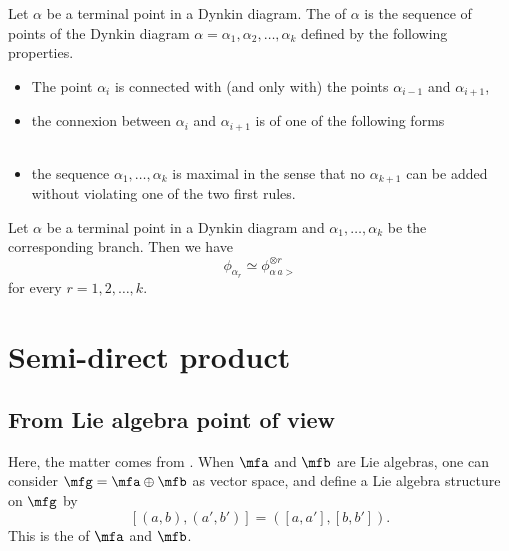 Let $\alpha$ be a terminal point in a Dynkin diagram. The  of $\alpha$ is the sequence of points of the Dynkin diagram $\alpha=\alpha_1,\alpha_2,\ldots,\alpha_k$ defined by the following properties.
\begin{itemize}
	\item The point $\alpha_i$ is connected with (and only with) the points $\alpha_{i-1}$ and $\alpha_{i+1}$,
	\item the connexion between $\alpha_i$ and $\alpha_{i+1}$ is of one of the following forms
	      \begin{subequations}
		      \begin{align}
			       \\
			       \\
			      
		      \end{align}
	      \end{subequations}
	\item the sequence $\alpha_1,\ldots,\alpha_k$ is maximal in the sense that no $\alpha_{k+1}$ can be added without violating one of the two first rules.
\end{itemize}

\begin{proposition}
	Let $\alpha$ be a terminal point in a Dynkin diagram and $\alpha_1,\ldots,\alpha_k$ be the corresponding branch. Then we have
	\begin{equation}
		\phi_{\alpha_r}\simeq \phi^{\otimes r}_{\alpha\,a>}
	\end{equation}
	for every $r=1,2,\ldots,k$.
\end{proposition}



\section{Semi-direct product}

\subsection{From Lie algebra point of view}\label{subsec:semi_Lie}

Here, the matter comes from \cite{Knapp,newfromold}. When $\mfa$ and $\mfb$ are Lie algebras, one can consider $\mfg=\mfa\oplus\mfb$ as vector space, and define a Lie algebra structure on $\mfg$ by
\[
	[ (a,b),(a',b') ]=( [a,a'],[b,b'] ).
\]
This is the  of $\mfa$ and $\mfb$.

